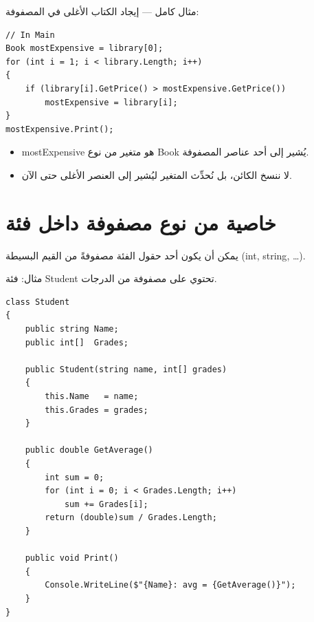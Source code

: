 \documentclass[14pt]{extarticle}
\begin{document}
\clearpage

مثال كامل — إيجاد الكتاب الأغلى في المصفوفة:

\begin{boxExample}
\begin{english}
\begin{verbatim}
// In Main
Book mostExpensive = library[0];
for (int i = 1; i < library.Length; i++)
{
    if (library[i].GetPrice() > mostExpensive.GetPrice())
        mostExpensive = library[i];
}
mostExpensive.Print();
\end{verbatim}
\end{english}
\end{boxExample}

\begin{itemize}[itemsep=1pt]
    \item \textenglish{mostExpensive} هو متغير من نوع \textenglish{Book} يُشير إلى أحد عناصر المصفوفة.
    \item لا ننسخ الكائن، بل نُحدِّث المتغير ليُشير إلى العنصر الأغلى حتى الآن.
\end{itemize}

\clearpage
\section{خاصية من نوع مصفوفة داخل فئة}

يمكن أن يكون أحد حقول الفئة مصفوفةً من القيم البسيطة (\textenglish{int}, \textenglish{string}, \ldots).

\begin{boxNote}
مثال: فئة \textenglish{Student} تحتوي على مصفوفة من الدرجات.
\end{boxNote}

\begin{boxExample}
\begin{english}
\begin{verbatim}
class Student
{
    public string Name;
    public int[]  Grades;

    public Student(string name, int[] grades)
    {
        this.Name   = name;
        this.Grades = grades;
    }

    public double GetAverage()
    {
        int sum = 0;
        for (int i = 0; i < Grades.Length; i++)
            sum += Grades[i];
        return (double)sum / Grades.Length;
    }

    public void Print()
    {
        Console.WriteLine($"{Name}: avg = {GetAverage()}");
    }
}
\end{verbatim}
\end{english}
\end{boxExample}
\end{document}

